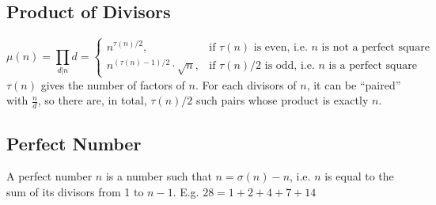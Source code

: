 \documentclass[12pt]{extarticle}
\begin{document}
\subsection*{Product of Divisors}
$$\mu(n)=\prod_{d|n}d=\begin{cases}n^{\tau(n)/2},&\text{if $\tau(n)$ is even, i.e. $n$ is not a perfect square} \\ n^{(\tau(n)-1)/2}\cdot\sqrt{n},&\text{if $\tau(n)/2$ is odd, i.e. $n$ is a perfect square}  \end{cases}$$
$\tau(n)$ gives the number of factors of $n$. For each divisors of $n$, it can be ``paired'' with $\frac{n}{d}$, so there are, in total, $\tau(n)/2$ such pairs whose product is exactly $n$.
\subsection*{Perfect Number}
A perfect number $n$ is a number such that $n=\sigma(n)-n$, i.e. $n$ is equal to the sum of its divisors from 1 to $n-1$. E.g. $28=1+2+4+7+14$
\end{document}

